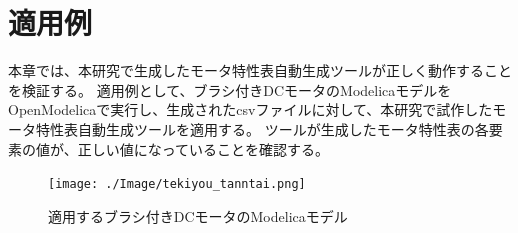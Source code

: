 \chapter{適用例}\label{cha:Indication}


本章では、本研究で生成したモータ特性表自動生成ツールが正しく動作することを検証する。
適用例として、ブラシ付きDCモータのModelicaモデルをOpenModelicaで実行し、生成されたcsvファイルに対して、本研究で試作したモータ特性表自動生成ツールを適用する。
ツールが生成したモータ特性表の各要素の値が、正しい値になっていることを確認する。


\begin{figure}[p]
	\centering
	\texttt{[image: ./Image/tekiyou\_tanntai.png]}
	\caption{適用するブラシ付きDCモータのModelicaモデル}
	\label{fig:tekiyou_tanntai}
\end{figure}

